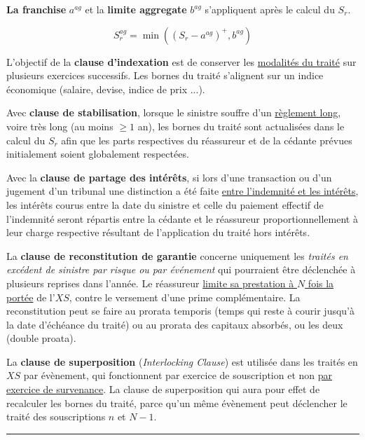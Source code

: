 \begin{f}

\textbf{La franchise} $a^{ag}$ et la \textbf{limite aggregate}  $b^{ag}$  s'appliquent après le calcul du $S_r$. 

$$
S_r^{ag} = \min\left( \left(S_r - a^{ag}  \right)^+,b^{ag}\right)  
$$
\medskip

L'objectif de la \textbf{clause d'indexation} est de conserver les \underline{modalités du traité} sur plusieurs exercices successifs.  Les bornes du traité s'alignent sur un indice économique (salaire, devise, indice de prix ...).
\medskip

Avec \textbf{clause de stabilisation}, lorsque le sinistre souffre d'un \underline{règlement long}, voire très long (au moins $\geq 1$ an), les bornes du traité sont actualisées dans le calcul du $S_r$ afin que les parts respectives du réassureur et de la cédante prévues initialement soient globalement respectées.
\medskip
	

Avec la \textbf{clause de partage des intérêts}, si lors d'une transaction ou d'un jugement d'un tribunal une distinction a été faite \underline{entre
		l'indemnité et les intérêts}, les intérêts courus entre la date du sinistre et celle du paiement effectif de l'indemnité seront répartis entre la cédante et le réassureur proportionnellement à
	leur charge respective résultant de l'application du traité hors intérêts.
\medskip


La \textbf{clause de reconstitution de garantie}
concerne uniquement les \emph{traités en excédent de sinistre par risque ou par événement} qui pourraient être déclenchée à plusieurs reprises dans l'année.
Le réassureur \underline{limite sa prestation à $N $ fois la portée} de l'$XS$, contre le versement d'une prime complémentaire. 
La reconstitution peut se faire au prorata temporis (temps qui reste à courir jusqu'à la date
d'échéance du traité) ou au prorata des capitaux absorbés, ou les deux (double proata). 

La \textbf{clause de superposition}
(\emph{Interlocking Clause})
 est utilisée dans les traités en $XS$ par évènement,
qui fonctionnent par exercice de souscription et non \underline{par exercice de survenance}.
La clause de
superposition qui aura pour effet de recalculer les bornes du traité, parce qu'un même évènement peut déclencher le traité des souscriptions $n$ et $N-1$.
\end{f}
\hrule

